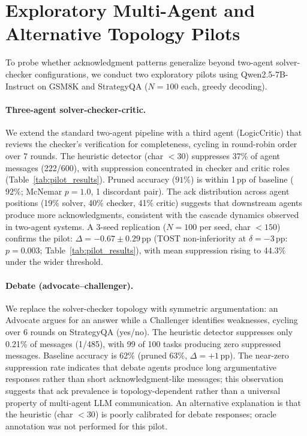 \section{Exploratory Multi-Agent and Alternative Topology Pilots}
\label{app:multiagent}

To probe whether acknowledgment patterns generalize beyond two-agent solver-checker configurations, we conduct two exploratory pilots using Qwen2.5-7B-Instruct on GSM8K and StrategyQA ($N = 100$ each, greedy decoding).

\paragraph{Three-agent solver-checker-critic.}
We extend the standard two-agent pipeline with a third agent (LogicCritic) that reviews the checker's verification for completeness, cycling in round-robin order over 7 rounds. The heuristic detector (char $< 30$) suppresses 37\% of agent messages (222/600), with suppression concentrated in checker and critic roles (Table~\ref{tab:pilot_results}). Pruned accuracy ($91\%$) is within 1\,pp of baseline ($92\%$; McNemar $p = 1.0$, 1 discordant pair). The ack distribution across agent positions (19\% solver, 40\% checker, 41\% critic) suggests that downstream agents produce more acknowledgments, consistent with the cascade dynamics observed in two-agent systems. A 3-seed replication ($N{=}100$ per seed, char $< 150$) confirms the pilot: $\Delta = -0.67 \pm 0.29$\,pp (TOST non-inferiority at $\delta = -3$\,pp: $p = 0.003$; Table~\ref{tab:pilot_results}), with mean suppression rising to 44.3\% under the wider threshold.

\paragraph{Debate (advocate--challenger).}
We replace the solver-checker topology with symmetric argumentation: an Advocate argues for an answer while a Challenger identifies weaknesses, cycling over 6 rounds on StrategyQA (yes/no). The heuristic detector suppresses only 0.21\% of messages (1/485), with 99 of 100 tasks producing zero suppressed messages. Baseline accuracy is 62\% (pruned 63\%, $\Delta = +1$\,pp). The near-zero suppression rate indicates that debate agents produce long argumentative responses rather than short acknowledgment-like messages; this observation suggests that ack prevalence is topology-dependent rather than a universal property of multi-agent LLM communication. An alternative explanation is that the heuristic (char $< 30$) is poorly calibrated for debate responses; oracle annotation was not performed for this pilot.

